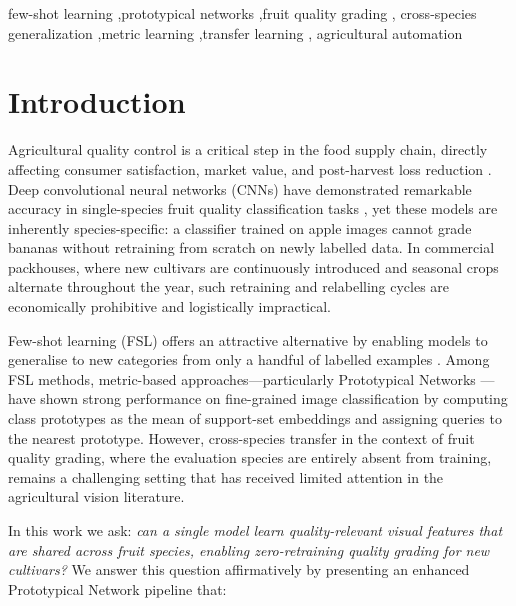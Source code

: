 \documentclass[preprint,12pt,authoryear]{elsarticle}
\begin{document}
\begin{frontmatter}
\begin{keyword}
few-shot learning \sep prototypical networks \sep fruit quality grading \sep
cross-species generalization \sep metric learning \sep transfer learning \sep
agricultural automation
\end{keyword}

\end{frontmatter}

\section{Introduction}
\label{intro}

Agricultural quality control is a critical step in the food supply chain, directly
affecting consumer satisfaction, market value, and post-harvest loss reduction
\citep{kader2002postharvest, lu2020recent}. Deep convolutional neural networks
(CNNs) have demonstrated remarkable accuracy in single-species fruit quality
classification tasks \citep{he2016deep, lecun1998gradient}, yet these models are
inherently species-specific: a classifier trained on apple images cannot grade
bananas without retraining from scratch on newly labelled data. In commercial
packhouses, where new cultivars are continuously introduced and seasonal crops
alternate throughout the year, such retraining and relabelling cycles are
economically prohibitive and logistically impractical.

Few-shot learning (FSL) offers an attractive alternative by enabling models to
generalise to new categories from only a handful of labelled examples
\citep{snell2017prototypical, vinyals2016matching, finn2017model}. Among
FSL methods, metric-based approaches---particularly Prototypical Networks
\citep{snell2017prototypical}---have shown strong performance on fine-grained
image classification by computing class prototypes as the mean of support-set
embeddings and assigning queries to the nearest prototype. However,
cross-species transfer in the context of fruit quality grading, where the
evaluation species are entirely absent from training, remains a challenging
setting that has received limited attention in the agricultural vision literature.

In this work we ask: \emph{can a single model learn quality-relevant visual
features that are shared across fruit species, enabling zero-retraining quality
grading for new cultivars?} We answer this question affirmatively by presenting an
enhanced Prototypical Network pipeline that:
\end{document}
